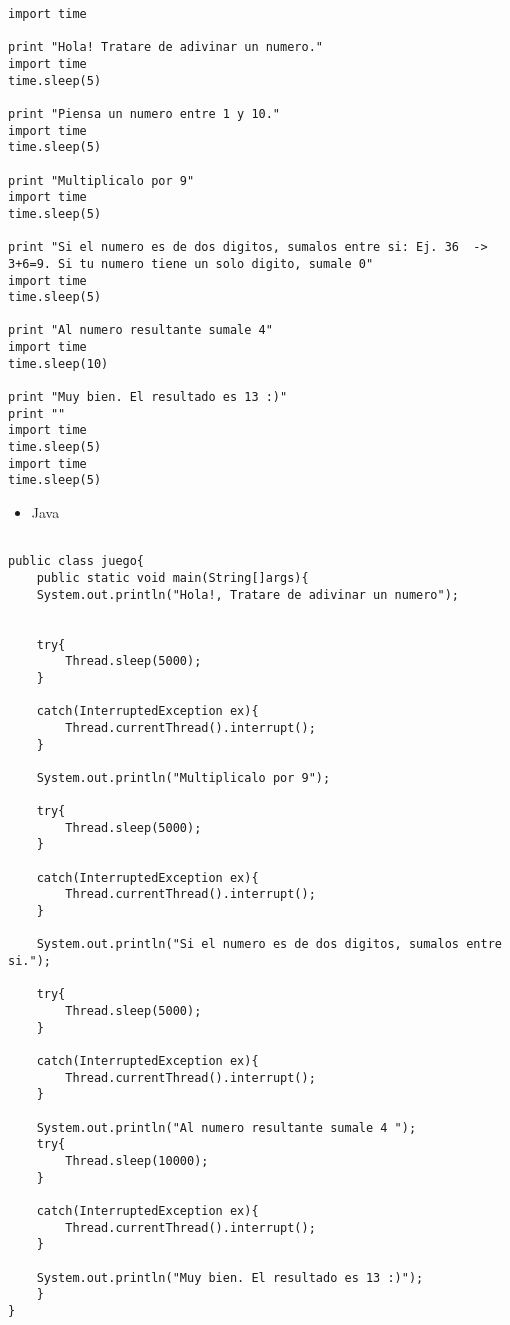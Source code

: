 \documentclass{article}
\begin{document}
\begin{verbatim}
import time

print "Hola! Tratare de adivinar un numero."
import time
time.sleep(5)

print "Piensa un numero entre 1 y 10."
import time
time.sleep(5)

print "Multiplicalo por 9"
import time
time.sleep(5)

print "Si el numero es de dos digitos, sumalos entre si: Ej. 36  -> 3+6=9. Si tu numero tiene un solo digito, sumale 0"
import time
time.sleep(5)

print "Al numero resultante sumale 4"
import time
time.sleep(10)

print "Muy bien. El resultado es 13 :)"
print ""
import time
time.sleep(5)
import time
time.sleep(5)

\end{verbatim}

\begin{itemize}
\item Java
\end{itemize}

\begin{verbatim}

public class juego{
    public static void main(String[]args){
	System.out.println("Hola!, Tratare de adivinar un numero");


	try{
	    Thread.sleep(5000);
	}

	catch(InterruptedException ex){
	    Thread.currentThread().interrupt();
	}

	System.out.println("Multiplicalo por 9");

	try{
	    Thread.sleep(5000);
	}

	catch(InterruptedException ex){
	    Thread.currentThread().interrupt();
	}

	System.out.println("Si el numero es de dos digitos, sumalos entre si.");

	try{
	    Thread.sleep(5000);
	}

	catch(InterruptedException ex){
	    Thread.currentThread().interrupt();
	}

	System.out.println("Al numero resultante sumale 4 ");
	try{
	    Thread.sleep(10000);
	}

	catch(InterruptedException ex){
	    Thread.currentThread().interrupt();
	}
	
	System.out.println("Muy bien. El resultado es 13 :)");
    }
}
\end{verbatim}
\end{document}
